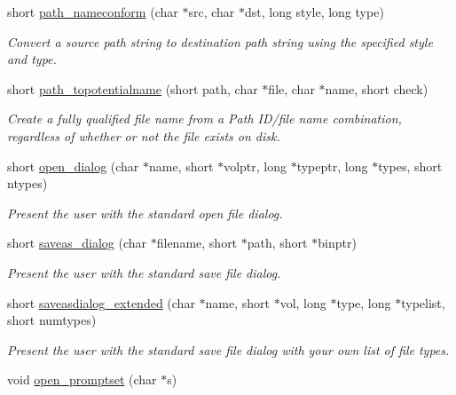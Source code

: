 \begin{DoxyCompactItemize}
short \hyperlink{group__files_gaaf014af82bc666cd974b83441eb4c9c6}{path\_\-nameconform} (char $\ast$src, char $\ast$dst, long style, long type)
\begin{DoxyCompactList}\small\item\em Convert a source path string to destination path string using the specified style and type. \item\end{DoxyCompactList}\item 
short \hyperlink{group__files_ga80ffef5b7e9ac12ef33dd048a0607133}{path\_\-topotentialname} (short path, char $\ast$file, char $\ast$name, short check)
\begin{DoxyCompactList}\small\item\em Create a fully qualified file name from a Path ID/file name combination, regardless of whether or not the file exists on disk. \item\end{DoxyCompactList}\item 
short \hyperlink{group__files_ga0d8fd0b13e2e623298a45e846af3fe1a}{open\_\-dialog} (char $\ast$name, short $\ast$volptr, long $\ast$typeptr, long $\ast$types, short ntypes)
\begin{DoxyCompactList}\small\item\em Present the user with the standard open file dialog. \item\end{DoxyCompactList}\item 
short \hyperlink{group__files_gaf526009ce84aed6f6213c4a99f6bd72d}{saveas\_\-dialog} (char $\ast$filename, short $\ast$path, short $\ast$binptr)
\begin{DoxyCompactList}\small\item\em Present the user with the standard save file dialog. \item\end{DoxyCompactList}\item 
short \hyperlink{group__files_gad43815aaa436e518a5cc68d2a340e4de}{saveasdialog\_\-extended} (char $\ast$name, short $\ast$vol, long $\ast$type, long $\ast$typelist, short numtypes)
\begin{DoxyCompactList}\small\item\em Present the user with the standard save file dialog with your own list of file types. \item\end{DoxyCompactList}\item 
void \hyperlink{group__files_gaff6d7264cad52c579b9373870bed50db}{open\_\-promptset} (char $\ast$s)

\end{DoxyCompactItemize}
